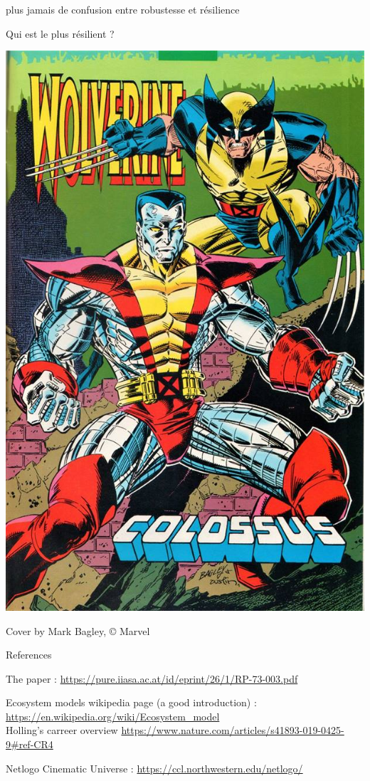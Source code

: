 \documentclass[11,aspectratio=1610]{beamer}
\begin{document}
\begin{frame}{plus jamais de confusion entre robustesse et résilience }

\centering
 Qui est le plus résilient ? 

\includegraphics[height=0.8\textheight]{img/wolverine_colossus.jpg}

\tiny{Cover by Mark Bagley,  © Marvel }

\end{frame}







\begin{frame}{References}


The paper : \url{https://pure.iiasa.ac.at/id/eprint/26/1/RP-73-003.pdf}

Ecosystem models wikipedia page (a good introduction) : \url{https://en.wikipedia.org/wiki/Ecosystem_model} \\

Holling's carreer overview \url{ https://www.nature.com/articles/s41893-019-0425-9\#ref-CR4}

Netlogo Cinematic Universe : \url{https://ccl.northwestern.edu/netlogo/}


\end{frame}
\end{document}
